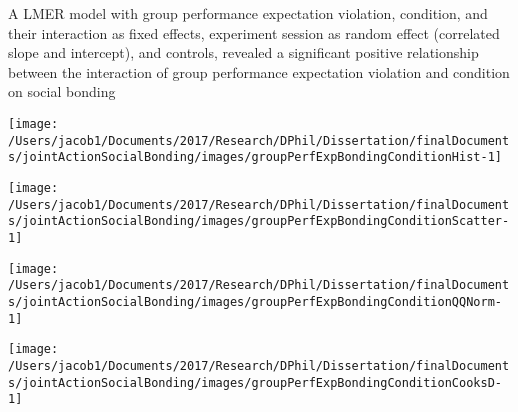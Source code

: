 \documentclass[english]{article}\usepackage[]{graphicx}\usepackage[]{color}
\makeatletter
\def\maxwidth{ %
  \ifdim\Gin@nat@width>\linewidth
    \linewidth
  \else
    \Gin@nat@width
  \fi
}
\newenvironment{kframe}{%
 \def\at@end@of@kframe{}%
 \ifinner\ifhmode%
  \def\at@end@of@kframe{\end{minipage}}%
  \begin{minipage}{\columnwidth}%
 \fi\fi%
 \def\FrameCommand##1{\hskip\@totalleftmargin \hskip-\fboxsep
 \colorbox{shadecolor}{##1}\hskip-\fboxsep
     \hskip-\linewidth \hskip-\@totalleftmargin \hskip\columnwidth}%
 \MakeFramed {\advance\hsize-\width
   \@totalleftmargin\z@ \linewidth\hsize
   \@setminipage}}%
 {\par\unskip\endMakeFramed%
 \at@end@of@kframe}
\newenvironment{knitrout}{}{} %
\makeatother
\begin{document}

A LMER model with group performance expectation violation, condition, and their interaction as fixed effects, experiment session as random effect (correlated slope and intercept), and controls, revealed a significant positive relationship between the interaction of group performance expectation violation and condition on social bonding


\begin{knitrout}
\color{fgcolor}

{\centering \texttt{[image: /Users/jacob1/Documents/2017/Research/DPhil/Dissertation/finalDocuments/jointActionSocialBonding/images/groupPerfExpBondingConditionHist-1]} 

}



\end{knitrout}
\begin{knitrout}
\color{fgcolor}

{\centering \texttt{[image: /Users/jacob1/Documents/2017/Research/DPhil/Dissertation/finalDocuments/jointActionSocialBonding/images/groupPerfExpBondingConditionScatter-1]} 

}



\end{knitrout}
\begin{knitrout}
\color{fgcolor}

{\centering \texttt{[image: /Users/jacob1/Documents/2017/Research/DPhil/Dissertation/finalDocuments/jointActionSocialBonding/images/groupPerfExpBondingConditionQQNorm-1]} 

}



\end{knitrout}
\begin{knitrout}
\color{fgcolor}\begin{kframe}


{\ttfamily\noindent\color{warningcolor}{\#\# Warning in optwrap(optimizer, devfun, getStart(start, rho\$lower, rho\$pp), : convergence code 1 from optimx}}\end{kframe}

{\centering \texttt{[image: /Users/jacob1/Documents/2017/Research/DPhil/Dissertation/finalDocuments/jointActionSocialBonding/images/groupPerfExpBondingConditionCooksD-1]} 

}



\end{knitrout}
\end{document}
